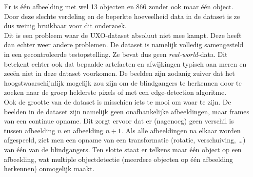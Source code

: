 \clearpage

Er is één afbeelding met wel 13 objecten en 866 zonder ook maar één object. Door deze slechte verdeling en de beperkte hoeveelheid data in de dataset is ze dus weinig bruikbaar voor dit onderzoek. \\

Dit is een probleem waar de UXO-dataset absoluut niet mee kampt. Deze heeft dan echter weer andere problemen. De dataset is namelijk volledig samengesteld in een gecontroleerde testopstelling. Ze bevat dus geen \emph{real-world}-data. Dit betekent echter ook dat bepaalde artefacten en afwijkingen typisch aan meren en zeeën niet in deze dataset voorkomen. De beelden zijn zodanig zuiver dat het hoogstwaarschijnlijk mogelijk zou zijn om de \glspl{blindganger} te herkennen door te zoeken naar de groep helderste pixels of met een edge-detection algoritme. \autocite{Torre_1986} \\

Ook de grootte van de dataset is misschien iets te mooi om waar te zijn. De beelden in de dataset zijn namelijk geen onafhankelijke afbeeldingen, maar frames van een continue opname. Dit zorgt ervoor dat er (nagenoeg) geen verschil is tussen afbeelding $n$ en afbeelding $n+1$. Als alle afbeeldingen na elkaar worden afgespeeld, ziet men een opname van een transformatie (rotatie, verschuiving, \dots) van één van de \glspl{blindganger}. Ten slotte staat er telkens maar één object op een afbeelding, wat multiple objectdetectie (meerdere objecten op één afbeelding herkennen) onmogelijk maakt.